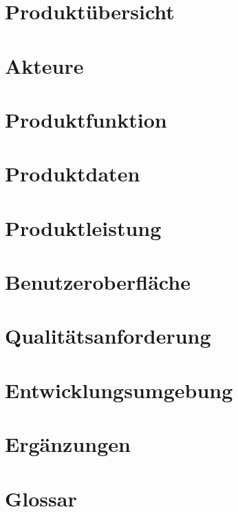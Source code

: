 \documentclass[10pt,a4paper]{article}
\begin{document}
\section{Produkt\"ubersicht}
\section{Akteure}
\section{Produktfunktion}
\section{Produktdaten}
\section{Produktleistung}
\section{Benutzeroberfl\"ache}
\section{Qualit\"atsanforderung}
\section{Entwicklungsumgebung}
\section{Erg\"anzungen}
\section{Glossar}
\end{document}
